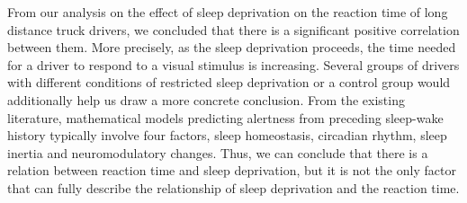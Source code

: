 \documentclass[
]{article}
\begin{document}
From our analysis on the effect of sleep deprivation on the reaction
time of long distance truck drivers, we concluded that there is a
significant positive correlation between them. More precisely, as the
sleep deprivation proceeds, the time needed for a driver to respond to a
visual stimulus is increasing. Several groups of drivers with different
conditions of restricted sleep deprivation or a control group would
additionally help us draw a more concrete conclusion. From the existing
literature, mathematical models predicting alertness from preceding
sleep-wake history typically involve four factors, sleep homeostasis,
circadian rhythm, sleep inertia and neuromodulatory changes. Thus, we
can conclude that there is a relation between reaction time and sleep
deprivation, but it is not the only factor that can fully describe the
relationship of sleep deprivation and the reaction time.
\end{document}
